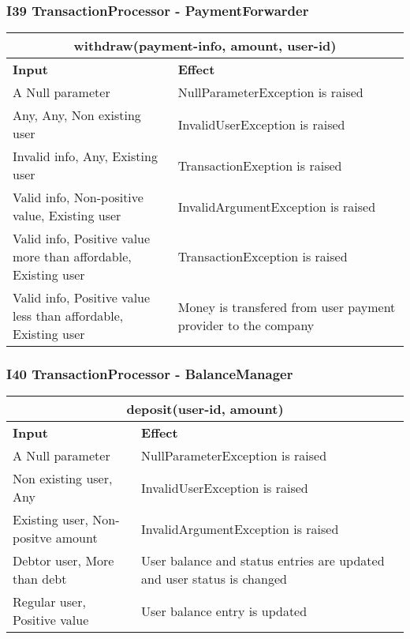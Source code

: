 \subsubsection{I39 TransactionProcessor - PaymentForwarder}
\begin{tabular}{|p{5cm}|p{7cm}|}
\hline
\multicolumn{2}{|c|}{withdraw(payment-info, amount, user-id)} \\
\hline
\textbf{Input} & \textbf{Effect} \\

\hline
A Null parameter & NullParameterException is raised \\

\hline
Any, Any, Non existing user & InvalidUserException is raised \\

\hline
Invalid info, Any, Existing user & TransactionExeption is raised \\

\hline
Valid info, Non-positive value, Existing user & InvalidArgumentException is raised\\

\hline
Valid info, Positive value more than affordable, Existing user & TransactionException is raised\\

\hline
Valid info, Positive value less than affordable, Existing user & Money is transfered from user payment provider to the company\\
\hline
\end{tabular}

\subsubsection{I40 TransactionProcessor - BalanceManager}
\begin{tabular}{|p{5cm}|p{7cm}|}
\hline
\multicolumn{2}{|c|}{deposit(user-id, amount)} \\
\hline
\textbf{Input} & \textbf{Effect} \\

\hline
A Null parameter & NullParameterException is raised \\

\hline
Non existing user, Any & InvalidUserException is raised \\

\hline
Existing user, Non-positve amount & InvalidArgumentException is raised \\

\hline
Debtor user, More than debt & User balance and status entries are updated and user status is changed \\

\hline
Regular user, Positive value & User balance entry is updated \\
\hline

\hline

\end{tabular}
